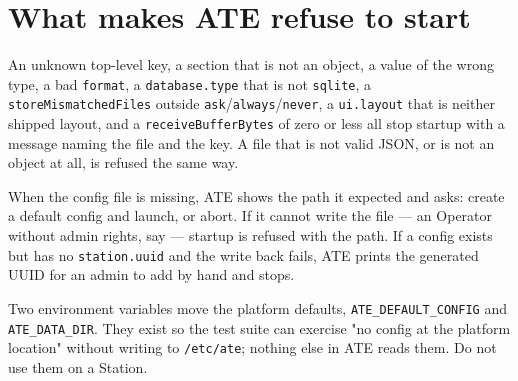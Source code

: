 \section{What makes ATE refuse to start}

An unknown top-level key, a section that is not an object, a value of the wrong type, a bad
\texttt{format}, a \texttt{database.type} that is not \texttt{sqlite}, a
\texttt{storeMismatchedFiles} outside \texttt{ask}/\texttt{always}/\texttt{never}, a
\texttt{ui.layout} that is neither shipped layout, and a \texttt{receiveBufferBytes} of zero or
less all stop startup with a message naming the file and the key. A file that is not valid JSON,
or is not an object at all, is refused the same way.

When the config file is missing, ATE shows the path it expected and asks: create a default config
and launch, or abort. If it cannot write the file --- an Operator without admin rights, say ---
startup is refused with the path. If a config exists but has no \texttt{station.uuid} and the write
back fails, ATE prints the generated UUID for an admin to add by hand and stops.

Two environment variables move the platform defaults, \texttt{ATE\_}\allowbreak\texttt{DEFAULT\_CONFIG}
and \texttt{ATE\_}\allowbreak\texttt{DATA\_DIR}. They exist so the test suite can exercise
"no config at the platform location" without writing to \texttt{/etc/ate}; nothing else in ATE
reads them. Do not use them on a Station.

